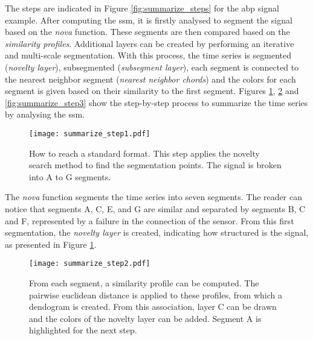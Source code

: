The steps are indicated in Figure \ref{fig:summarize_steps} for the \gls{abp} signal example. After computing the \gls{ssm}, it is firstly analysed to segment the signal based on the \textit{nova} function. These segments are then compared based on the \textit{similarity profiles}. Additional layers can be created by performing an iterative and multi-scale segmentation. With this process, the time series is segmented (\textit{novelty layer}), subsegmented (\textit{subsegment layer}), each segment is connected to the nearest neighbor segment (\textit{nearest neighbor chords}) and the colors for each segment is given based on their similarity to the first segment. Figures \ref{fig:summarize_step1}, \ref{fig:summarize_step2} and \ref{fig:summarize_step3} show the step-by-step process to summarize the time series by analysing the \gls{ssm}. 

\begin{figure}
\centering
\texttt{[image: summarize\_step1.pdf]}
\caption{How to reach a standard format. This step applies the novelty search method to find the segmentation points. The signal is broken into A to G segments.}
\label{fig:summarize_step1}
\end{figure}

The \textit{nova} function segments the time series into seven segments. The reader can notice that segments A, C, E, and G are similar and separated by segments B, C and F, represented by a failure in the connection of the sensor. From this first segmentation, the \textit{novelty layer} is created, indicating how structured is the signal, as presented in Figure \ref{fig:summarize_step1}.

\begin{figure}
\centering
\texttt{[image: summarize\_step2.pdf]}
\caption{From each segment, a similarity profile can be computed. The pairwise euclidean distance is applied to these profiles, from which a dendogram is created. From this association, layer C can be drawn and the colors of the novelty layer can be added. Segment A is highlighted for the next step.}
\label{fig:summarize_step2}
\end{figure}

